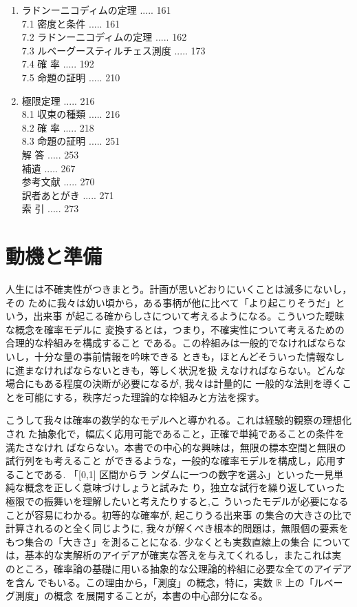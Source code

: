 \documentclass[14pt]{jsarticle}
\begin{document}
\begin{enumerate}
6.1 多次元ルベーグ測度 ..... 137\\
6.2 積 $\sigma$-加法族 ..... 138\\
6.3 積測度の構成 ..... 139\\
6.4 フビニの定理 ..... 146\\
6.5 確 率 ..... 149\\
6.6 命題の証明 ..... 160
  \item ラドンーニコディムの定理 ..... 161\\
7.1 密度と条件 ..... 161\\
7.2 ラドンーニコディムの定理 ..... 162\\
7.3 ルベーグースティルチェス測度 ..... 173\\
7.4 確 率 ..... 192\\
7.5 命題の証明 ..... 210
  \item 極限定理 ..... 216\\
8.1 収束の種類 ..... 216\\
8.2 確 率 ..... 218\\
8.3 命題の証明 ..... 251\\
解 答 ..... 253\\
補遺 ..... 267\\
参考文献 ..... 270\\
訳者あとがき ..... 271\\
索 引 ..... 273
\end{enumerate}

\section*{動機と準備}
人生には不確実性がつきまとう。計画が思いどおりにいくことは滅多にないし，その ために我々は幼い頃から，ある事柄が他に比べて「より起こりそうだ」という，出来事 が起こる確からしさについて考えるようになる。こういつた曖昧な概念を確率モデルに 変換するとは，つまり，不確実性について考えるための合理的な枠組みを構成すること である。この枠組みは一般的でなければならないし，十分な量の事前情報を吟味できる ときも，ほとんどそういった情報なしに進まなければならないときも，等しく状況を扱 えなければならない。どんな場合にもある程度の決断が必要になるが, 我々は計量的に 一般的な法則を導くことを可能にする，秩序だった理論的な枠組みと方法を探す。

こうして我々は確率の数学的なモデルへと導かれる。これは経験的観察の理想化され た抽象化で，幅広く応用可能であること，正確で単純であることの条件を満たさなけれ ばならない。本書での中心的な興味は，無限の標本空間と無限の試行列をも考えること ができるような，一般的な確率モデルを構成し，応用することである. 「[0,1] 区間からラ ンダムに一つの数字を選ふ」といった一見単純な概念を正しく意味づけしょうと試みた り，独立な試行を繰り返していった極限での振舞いを理解したいと考えたりすると,こ ういったモデルが必要になることが容易にわかる。初等的な確率が, 起こりうる出来事 の集合の大きさの比で計算されるのと全く同じように, 我々が解くべき根本的問題は，無限個の要素をもつ集合の「大きさ」を測ることになる. 少なくとも実数直線上の集合 については，基本的な実解析のアイデアが確実な答えを与えてくれるし，またこれは実 のところ，確率論の基礎に用いる抽象的な公理論的枠組に必要な全てのアイデアを含ん でもいる。この理由から，「測度」の概念，特に，実数 $\mathbb{R}$ 上の「ルベーグ測度」の概念 を展開することが，本書の中心部分になる。
\end{document}
